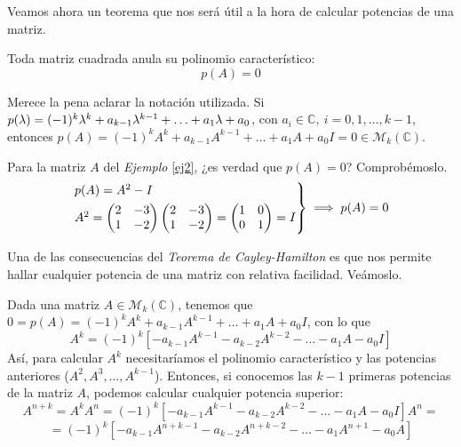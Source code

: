   Veamos ahora un teorema que nos será útil a la hora de calcular potencias de una matriz.

  \begin{nth}
    Toda matriz cuadrada anula su polinomio característico: $$p(A) = 0$$
  \end{nth}

  \begin{nota}
	Merece la pena aclarar la notación utilizada. Si $p(\lambda) = (-1)^k \lambda^k + a_{k-1}\lambda^{k-1} + \hdots + a_1\lambda + a_0$, con $a_i
  \in \mathbb C, \ i=0, 1, \hdots, k -1$, entonces $p(A) = (-1)^kA^k + a_{k-1}A^{k-1} + \hdots + a_1A + a_0I = 0 \in \mathcal M_k(\mathbb{C})$.
\end{nota}

  \begin{ejemplo} Para la matriz $A$ del \textit{Ejemplo}  \eqref{ej2}, ¿es verdad que $p(A) = 0$? Comprobémoslo.
  $$\begin{rcases}
   p(A) = A^2 - I \\
    A^2 =
    \begin{pmatrix}
      2 & -3 \\
      1 & -2
    \end{pmatrix}
    \begin{pmatrix}
      2  & -3 \\
      1 & -2
    \end{pmatrix} =
    \begin{pmatrix}
      1 & 0 \\
      0 & 1
    \end{pmatrix} = I
    \end{rcases} \implies p(A) = 0$$
  \end{ejemplo}

  Una de las consecuencias del \textit{Teorema de Cayley-Hamilton} es que nos permite hallar cualquier potencia de una matriz con relativa facilidad. Veámoslo.

  Dada una matriz $A \in \mathcal M_k(\mathbb C)$, tenemos que  $0 = p(A) = (-1)^kA^k + a_{k-1}A^{k-1} + \hdots + a_1A + a_0I$, con lo
que $$A^k = (-1)^k\left[-a_{k-1}A^{k-1}-a_{k-2}A^{k-2} - \hdots - a_1A -
  a_0I\right]$$
Así, para calcular $A^k$ necesitaríamos el polinomio característico y las
potencias anteriores ($A^2, A^3, \hdots, A^{k-1}$).
Entonces, si conocemos las $k-1$ primeras potencias de la matriz $A$, podemos calcular cualquier potencia superior: $$A^{n+k} = A^kA^n = (-1)^k\left[-a_{k-1}A^{k-1}-a_{k-2}A^{k-2} - \hdots - a_1A - a_0I\right] A^n =$$ $$=(-1)^k\left[-a_{k-1}A^{n+k-1}-a_{k-2}A^{n+k-2} - \hdots - a_1A^{n+1} - a_0A\right]$$

